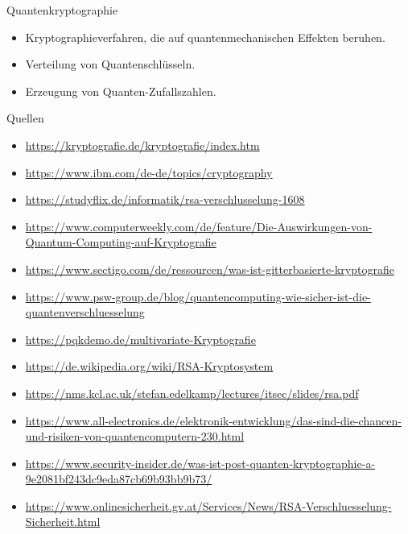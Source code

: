 \documentclass{beamer}
\begin{document}
    \begin{frame}{Quantenkryptographie}
        \begin{itemize}
            \item Kryptographieverfahren, die auf quantenmechanischen Effekten beruhen.
            \item Verteilung von Quantenschlüsseln.
            \item Erzeugung von Quanten-Zufallszahlen.
        \end{itemize}
    \end{frame}

    \begin{frame}{Quellen}
        \begin{itemize}
            \item \url{https://kryptografie.de/kryptografie/index.htm}
            \item \url{https://www.ibm.com/de-de/topics/cryptography}
            \item \url{https://studyflix.de/informatik/rsa-verschlusselung-1608}
            \item \url{https://www.computerweekly.com/de/feature/Die-Auswirkungen-von-Quantum-Computing-auf-Kryptografie}
            \item \url{https://www.sectigo.com/de/ressourcen/was-ist-gitterbasierte-kryptografie}
            \item \url{https://www.psw-group.de/blog/quantencomputing-wie-sicher-ist-die-quantenverschluesselung}
            \item \url{https://pqkdemo.de/multivariate-Kryptografie}
            \item \url{https://de.wikipedia.org/wiki/RSA-Kryptosystem}
            \item \url{https://nms.kcl.ac.uk/stefan.edelkamp/lectures/itsec/slides/rsa.pdf}
            \item \url{https://www.all-electronics.de/elektronik-entwicklung/das-sind-die-chancen-und-risiken-von-quantencomputern-230.html}
            \item \url{https://www.security-insider.de/was-ist-post-quanten-kryptographie-a-9e2081bf243dc9eda87cb69b93bb9b73/}
            \item \url{https://www.onlinesicherheit.gv.at/Services/News/RSA-Verschluesselung-Sicherheit.html}
        \end{itemize}
    \end{frame}
\end{document}
